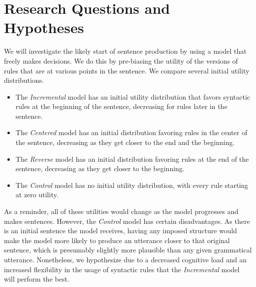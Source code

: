\section{Research Questions and Hypotheses}
We will investigate the likely start of sentence production by using a model that freely makes decisions. We do this by pre-biasing the utility of the versions of rules that are at various points in the sentence. We compare several initial utility distributions. 

\begin{itemize}
\item The \textit{Incremental} model has an initial utility distribution that favors syntactic rules at the beginning of the sentence, decreasing for rules later in the sentence.
\item The \textit{Centered} model has an initial distribution favoring rules in the center of the sentence, decreasing as they get closer to the end and the beginning.
\item The \textit{Reverse} model has an initial distribution favoring rules at the end of the sentence, decreasing as they get closer to the beginning.
\item The \textit{Control} model has no initial utility distribution, with every rule starting at zero utility.
\end{itemize}

As a reminder, all of these utilities would change as the model progresses and makes sentences. However, the \textit{Control} model has certain disadvantages. As there is an initial sentence the model receives, having any imposed structure would make the model more likely to produce an utterance closer to that original sentence, which is presumably slightly more plausible than any given grammatical utterance. Nonetheless, we hypothesize due to a decreased cognitive load and an increased flexibility in the usage of syntactic rules that the \textit{Incremental} model will perform the best.